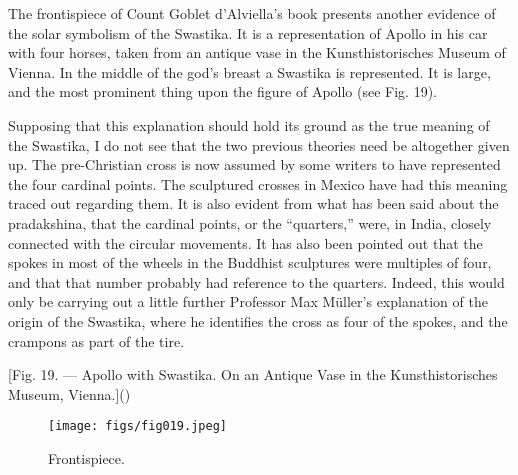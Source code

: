 \documentclass[a4paper, 11pt, oneside, polutonikogreek, english]{article}
\begin{document}
The frontispiece of Count Goblet d'Alviella's book presents another evidence of the solar symbolism of the Swastika. It is a representation of Apollo in his car with four horses, taken from an antique vase in the Kunsthistorisches Museum of Vienna. In the middle of the god's breast a Swastika is represented. It is large, and the most prominent thing upon the figure of Apollo (see Fig. 19).

Supposing that this explanation should hold its ground as the true meaning of the Swastika, I do not see that the two previous theories need be altogether given up. The pre-Christian cross is now assumed by some writers to have represented the four cardinal points. The sculptured crosses in Mexico have had this meaning traced out regarding them. It is also evident from what has been said about the pradakshina, that the cardinal points, or the ``quarters,'' were, in India, closely connected with the circular movements. It has also been pointed out that the spokes in most of the wheels in the Buddhist sculptures were multiples of four, and that that number probably had reference to the quarters. Indeed, this would only be carrying out a little further Professor Max Müller's explanation of the origin of the Swastika, where he identifies the cross as four of the spokes, and the crampons as part of the tire.

[Fig. 19. --- Apollo with Swastika. On an Antique Vase in the Kunsthistorisches Museum, Vienna.]()
\begin{figure}[H]
\centering
\texttt{[image: figs/fig019.jpeg]}
\caption{Frontispiece.}
\end{figure}
\end{document}
